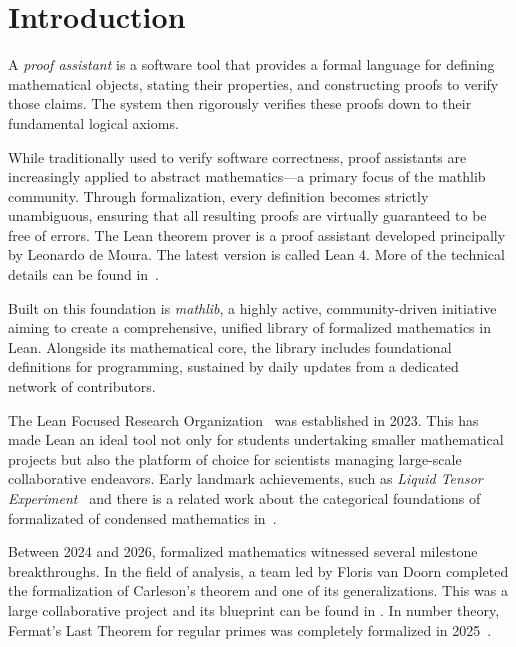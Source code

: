 \chapter*{Introduction}


A \emph{proof assistant} is a software tool that provides a formal language for
defining mathematical objects, stating their properties, and constructing
proofs to verify those claims. The system then rigorously verifies
these proofs down to their fundamental logical axioms.

While traditionally used to verify software correctness, proof assistants
are increasingly applied to abstract mathematics—a primary focus of the
mathlib community. Through formalization, every definition becomes strictly
unambiguous, ensuring that all resulting proofs are virtually guaranteed
to be free of errors. The Lean theorem prover is a proof assistant
developed principally by Leonardo de Moura. The latest version is called Lean 4.
More of the technical details can be found in~\cite{deMoura2021}.

Built on this foundation is \emph{mathlib}, a highly active, community-driven
initiative aiming to create a comprehensive, unified library of formalized
mathematics in Lean. Alongside its mathematical core, the library includes
foundational definitions for programming, sustained by daily updates from a
dedicated network of contributors.

The Lean Focused Research Organization~\cite{fro2024} was established in 2023. This
has made Lean an ideal tool not only for students undertaking smaller
mathematical projects but also the platform of choice for scientists managing
large-scale collaborative endeavors. Early landmark achievements, such as
\emph{Liquid Tensor Experiment}~\cite{commelin2022liquid} and
there is a related work about the categorical foundations of formalizated of
condensed mathematics in~\cite{asgeirsson2024categorical}.

Between 2024 and 2026, formalized mathematics witnessed several milestone
breakthroughs. In the field of analysis, a team led by Floris van Doorn
completed the formalization of Carleson's theorem and one of its
generalizations. This was a large collaborative project and its blueprint can be found in
\cite{becker2025blueprintformalizationcarlesonstheorem}. In number theory, Fermat's Last
Theorem for regular primes was completely formalized in 2025~\cite{best2025completeformalizationfermatstheorem}.

